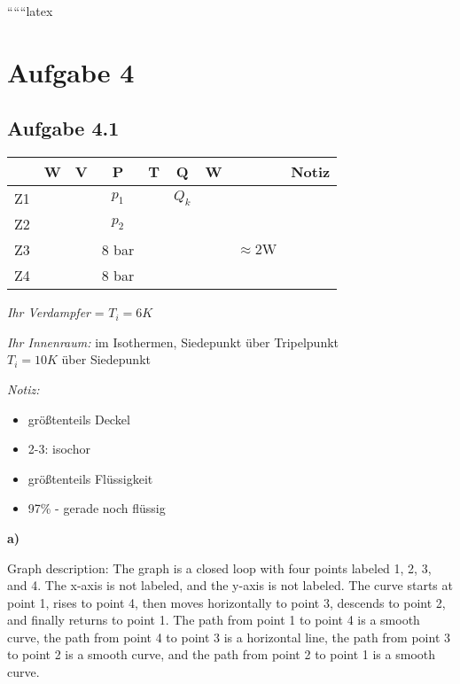 
``````latex


\section*{Aufgabe 4}

\subsection*{Aufgabe 4.1}

\begin{tabular}{|c|c|c|c|c|c|c|c|c|}
\hline
 & W & V & P & T & Q & W & & Notiz \\
\hline
Z1 & & & $p_1$ & & $Q_k$ & & & \\
\hline
Z2 & & & $p_2$ & & & & & \\
\hline
Z3 & & & 8 bar & & & & $\approx 2 \text{W}$ & \\
\hline
Z4 & & & 8 bar & & & & & \\
\hline
\end{tabular}

\bigskip

\noindent
\textit{Ihr Verdampfer} = $T_i = 6K$

\bigskip

\noindent
\textit{Ihr Innenraum:} im Isothermen, Siedepunkt über Tripelpunkt \\
$T_i = 10K$ über Siedepunkt

\bigskip

\noindent
\textit{Notiz:} \\
\begin{itemize}
    \item größtenteils Deckel
    \item 2-3: isochor
    \item größtenteils Flüssigkeit
    \item 97\% - gerade noch flüssig
\end{itemize}

\bigskip

\noindent
\textbf{a)}

\bigskip

\noindent
Graph description: The graph is a closed loop with four points labeled 1, 2, 3, and 4. The x-axis is not labeled, and the y-axis is not labeled. The curve starts at point 1, rises to point 4, then moves horizontally to point 3, descends to point 2, and finally returns to point 1. The path from point 1 to point 4 is a smooth curve, the path from point 4 to point 3 is a horizontal line, the path from point 3 to point 2 is a smooth curve, and the path from point 2 to point 1 is a smooth curve.

